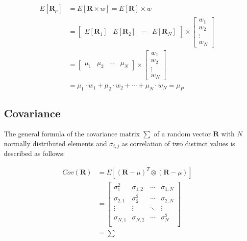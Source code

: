 \documentclass[
  oneside, a4paper, 12pt, openany]{book}
\theoremstyle{definition}
\theoremstyle{definition}
\theoremstyle{definition}
\theoremstyle{definition}
\theoremstyle{remark}
\begin{document}
\begin{align*}
E[\pmb{R}_p] &=
 E[\pmb{R} \times w] = 
 E[\pmb{R}] \times w \\
 &= 
  \begin{bmatrix}
    E[\pmb{R}_{1}] & E[\pmb{R}_{2}] & \cdots & E[\pmb{R}_{N}]
 \end{bmatrix}
  \times 
  \begin{bmatrix}
    w_{1} \\ 
    w_{2} \\
    \vdots \\
    w_{N}  
 \end{bmatrix} \\
 &=
   \begin{bmatrix}
    \mu_{1} & \mu_{2} & \cdots & \mu_{N}
 \end{bmatrix}
  \times 
  \begin{bmatrix}
    w_{1} \\ 
    w_{2} \\
    \vdots \\
    w_{N}  
 \end{bmatrix} \\
 &=
 \mu_{1} \cdot w_1 + \mu_{2} \cdot w_2 + \cdots + \mu_{N} \cdot w_{N} 
 =
 \mu_P
\end{align*}

\hypertarget{covariance}{%
\subsection{Covariance}\label{covariance}}

The general formula of the covariance matrix \(\textstyle\sum\) of a random vector \(\pmb{R}\) with \(N\) normally distributed elements and \(\sigma_{i,j}\) as correlation of two distinct values is described as follows:

\begin{align*}
  Cov(\pmb{R}) &= E[(\pmb{R}-\mu)^T \otimes (\pmb{R}-\mu)] \\
  &=   \begin{bmatrix}
    \sigma_1^2 & \sigma_{1,2} & \cdots & \sigma_{1,N} \\
    \sigma_{2, 1} & \sigma_2^2 & \cdots & \sigma_{2, N} \\
    \vdots  & \vdots & \ddots & \vdots \\
    \sigma_{N, 1} & \sigma_{N, 2} & \cdots & \sigma_N^2 \\
 \end{bmatrix}\\
  &=\textstyle\sum
\end{align*}
\end{document}

